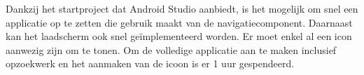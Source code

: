 Dankzij het startproject dat Android Studio aanbiedt, is het mogelijk om snel een applicatie op te zetten 
die gebruik maakt van de navigatiecomponent. Daarnaast kan het laadscherm ook snel geïmplementeerd worden. 
Er moet enkel al een icon aanwezig zijn om te tonen. Om de volledige applicatie aan te maken inclusief opzoekwerk
en het aanmaken van de icoon
is er 1 uur gespendeerd.

